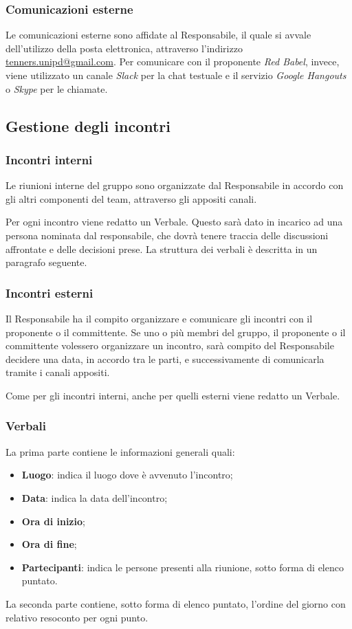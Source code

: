    		\subsubsection{Comunicazioni esterne}
   		Le comunicazioni esterne sono affidate al Responsabile, il quale si avvale dell'utilizzo della posta elettronica, attraverso l'indirizzo \href{mailto:tenners.unipd@gmail.com}{tenners.unipd@gmail.com}.
   		Per comunicare con il proponente \textit{Red Babel}, invece, viene utilizzato un canale \textit{Slack\glo} per la chat testuale e il servizio \textit{Google Hangouts\glos} o \textit{Skype\glo} per le chiamate. 
   		
   	\subsection{Gestione degli incontri}
   		\subsubsection{Incontri interni}
   		Le riunioni interne del gruppo sono organizzate dal Responsabile in accordo con gli altri componenti del team, attraverso gli appositi canali.
   		
   		\noindent Per ogni incontro viene redatto un Verbale. Questo sarà dato in incarico ad una persona nominata dal responsabile, che dovrà tenere traccia delle discussioni affrontate e delle decisioni prese. La struttura dei verbali è descritta in un paragrafo seguente.
   		
   		\subsubsection{Incontri esterni}
   		Il Responsabile ha il compito organizzare e comunicare gli incontri con il proponente o il committente. Se uno o più membri del gruppo, il proponente o il committente volessero organizzare un incontro, sarà compito del Responsabile decidere una data, in accordo tra le parti, e successivamente di comunicarla tramite i canali appositi.
   		
   		\noindent Come per gli incontri interni, anche per quelli esterni viene redatto un Verbale.
   		\subsubsection{Verbali}
   		La prima parte contiene le informazioni generali quali:
   		\begin{itemize}
   			\item \textbf{Luogo}: indica il luogo dove è avvenuto l'incontro;
   			\item \textbf{Data}: indica la data dell'incontro;
   			\item \textbf{Ora di inizio};
   			\item \textbf{Ora di fine};
   			\item \textbf{Partecipanti}: indica le persone presenti alla riunione, sotto forma di elenco puntato.
   		\end{itemize}
   		La seconda parte contiene, sotto forma di elenco puntato, l'ordine del giorno con relativo resoconto per ogni punto.
   		
